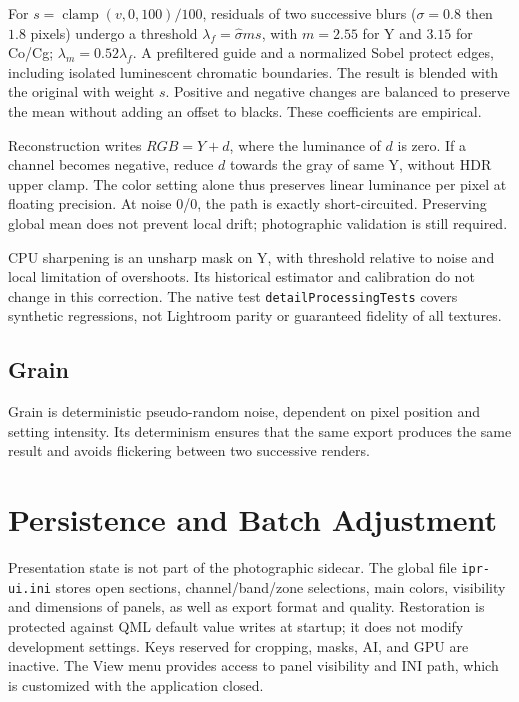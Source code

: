 For $s=\operatorname{clamp}(v,0,100)/100$, residuals of two successive blurs ($\sigma=0.8$ then $1.8$ pixels) undergo a threshold $\lambda_f=\widehat\sigma ms$, with $m=2.55$ for Y and $3.15$ for Co/Cg; $\lambda_m=0.52\lambda_f$. A prefiltered guide and a normalized Sobel protect edges, including isolated luminescent chromatic boundaries. The result is blended with the original with weight $s$. Positive and negative changes are balanced to preserve the mean without adding an offset to blacks. These coefficients are empirical.

Reconstruction writes $RGB=Y+d$, where the luminance of $d$ is zero. If a channel becomes negative, reduce $d$ towards the gray of same Y, without HDR upper clamp. The color setting alone thus preserves linear luminance per pixel at floating precision. At noise 0/0, the path is exactly short-circuited. Preserving global mean does not prevent local drift; photographic validation is still required.

CPU sharpening is an unsharp mask on Y, with threshold relative to noise and local limitation of overshoots. Its historical estimator and calibration do not change in this correction. The native test \texttt{detailProcessingTests} covers synthetic regressions, not Lightroom parity or guaranteed fidelity of all textures.

\subsection{Grain}

Grain is deterministic pseudo-random noise, dependent on pixel position and setting intensity. Its determinism ensures that the same export produces the same result and avoids flickering between two successive renders.

\section{Persistence and Batch Adjustment}

Presentation state is not part of the photographic sidecar. The global file \texttt{ipr-ui.ini} stores open sections, channel/band/zone selections, main colors, visibility and dimensions of panels, as well as export format and quality. Restoration is protected against QML default value writes at startup; it does not modify development settings. Keys reserved for cropping, masks, AI, and GPU are inactive. The View menu provides access to panel visibility and INI path, which is customized with the application closed.

